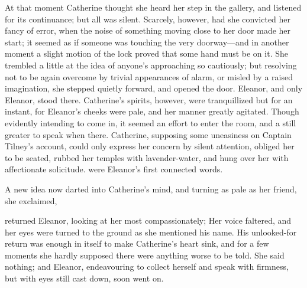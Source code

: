 At that moment Catherine thought she heard her step in the gallery, and listened for its continuance; but all was silent. Scarcely, however, had she convicted her fancy of error, when the noise of something moving close to her door made her start; it seemed as if someone was touching the very doorway---and in another moment a slight motion of the lock proved that some hand must be on it. She trembled a little at the idea of anyone's approaching so cautiously; but resolving not to be again overcome by trivial appearances of alarm, or misled by a raised imagination, she stepped quietly forward, and opened the door. Eleanor, and only Eleanor, stood there. Catherine's spirits, however, were tranquillized but for an instant, for Eleanor's cheeks were pale, and her manner greatly agitated. Though evidently intending to come in, it seemed an effort to enter the room, and a still greater to speak when there. Catherine, supposing some uneasiness on Captain Tilney's account, could only express her concern by silent attention, obliged her to be seated, rubbed her temples with lavender-water, and hung over her with affectionate solicitude.  were Eleanor's first connected words. 



A new idea now darted into Catherine's mind, and turning as pale as her friend, she exclaimed, 

 returned Eleanor, looking at her most compassionately;  Her voice faltered, and her eyes were turned to the ground as she mentioned his name. His unlooked-for return was enough in itself to make Catherine's heart sink, and for a few moments she hardly supposed there were anything worse to be told. She said nothing; and Eleanor, endeavouring to collect herself and speak with firmness, but with eyes still cast down, soon went on. 


